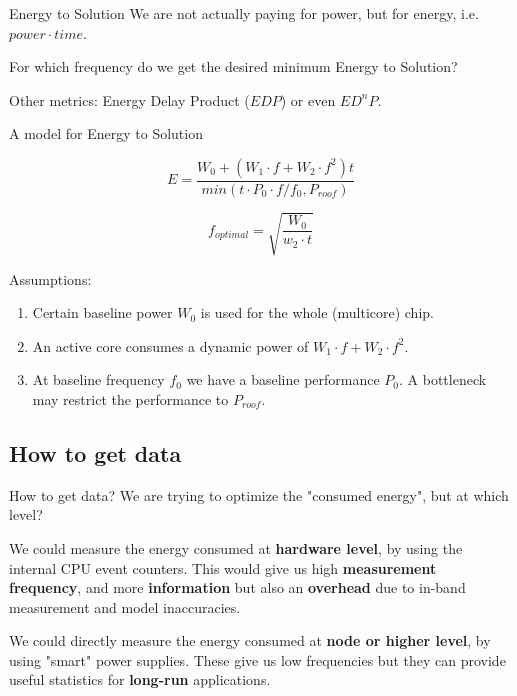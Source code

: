 \documentclass[10pt, compress]{beamer}
\begin{document}
\begin{frame}[fragile]{Energy to Solution}
 We are not actually paying for power, but for energy, i.e. $power \cdot time$.
 
 For which frequency do we get the desired \alert{minimum Energy to Solution}?
 
 Other metrics: Energy Delay Product ($EDP$) or even $ED^nP$. 
\end{frame}

\begin{frame}[fragile]{A model for Energy to Solution}

\begin{equation}
E = \frac{W_0 + (W_1 \cdot f + W_2 \cdot f^2 ) t}{min(t \cdot P_0 \cdot f / f_0 , P_{roof})}
\end{equation}

\begin{equation}
f_{optimal} = \sqrt{\frac{W_0}{w_2 \cdot t}}
\end{equation}

Assumptions:
\begin{enumerate}
\item Certain baseline power $W_0$ is used for the whole (multicore) chip.
\item An active core consumes a dynamic power of $W_1 \cdot f + W_2 \cdot f^2$.
\item At baseline frequency $f_0$ we have a baseline performance $P_0$. A bottleneck
may restrict the performance to $P_{roof}$.
\end{enumerate}
\end{frame}


\subsection{How to get data}
\begin{frame}[fragile]{How to get data?}
We are trying to optimize the "consumed energy", but at which level?

\pause

We could measure the energy consumed at \textbf{hardware level}, by using
the internal CPU event counters. This would give us high \textbf{measurement frequency},
and more \textbf{information} but also an \textbf{overhead} due to in-band measurement and model inaccuracies.

\pause

We could directly measure the energy consumed at \textbf{node or higher level}, by using "smart" power supplies. These give us low frequencies but they can provide useful statistics for \textbf{long-run} applications.
\end{frame}
\end{document}
